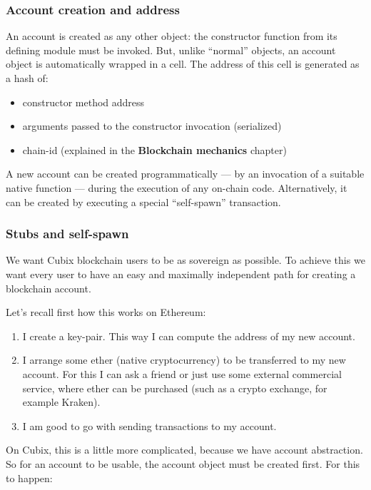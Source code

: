 \documentclass[a4paper]{article}
\begin{document}
\subsubsection{Account creation and address}

An account is created as any other object: the constructor function from its defining module must be invoked. But, unlike ``normal'' objects, an account object is automatically wrapped in a cell. The address of this cell is generated as a hash of:

\begin{itemize}
  \item constructor method address
  \item arguments passed to the constructor invocation (serialized)
  \item chain-id (explained in the \textbf{Blockchain mechanics} chapter)
\end{itemize}

A new account can be created programmatically --- by an invocation of a suitable native function --- during the execution of any on-chain code. Alternatively, it can be created by executing a special ``self-spawn'' transaction.

\subsubsection{Stubs and self-spawn}

We want Cubix blockchain users to be as sovereign as possible. To achieve this we want every user to have an easy and maximally independent path for creating a blockchain account.

Let's recall first how this works on Ethereum:

\begin{enumerate}
  \item I create a key-pair. This way I can compute the address of my new account.
  \item I arrange some ether (native cryptocurrency) to be transferred to my new account. For this I can ask a friend or just use some external commercial service, where ether can be purchased (such as a crypto exchange, for example Kraken).
  \item I am good to go with sending transactions to my account.
\end{enumerate}

On Cubix, this is a little more complicated, because we have account abstraction. So for an account to be usable, the account object must be created first. For this to happen:
\end{document}

